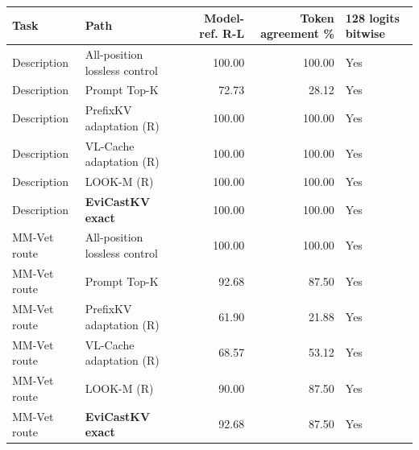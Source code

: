 \begin{tabular}{llrrl}
\toprule
Task & Path & Model-ref. R-L & Token agreement \% & 128 logits bitwise\\\midrule
Description & All-position lossless control & 100.00 & 100.00 & Yes\\
Description & Prompt Top-K & 72.73 & 28.12 & Yes\\
Description & PrefixKV adaptation (R) & 100.00 & 100.00 & Yes\\
Description & VL-Cache adaptation (R) & 100.00 & 100.00 & Yes\\
Description & LOOK-M (R) & 100.00 & 100.00 & Yes\\
Description & \textbf{EviCastKV exact} & 100.00 & 100.00 & Yes\\
MM-Vet route & All-position lossless control & 100.00 & 100.00 & Yes\\
MM-Vet route & Prompt Top-K & 92.68 & 87.50 & Yes\\
MM-Vet route & PrefixKV adaptation (R) & 61.90 & 21.88 & Yes\\
MM-Vet route & VL-Cache adaptation (R) & 68.57 & 53.12 & Yes\\
MM-Vet route & LOOK-M (R) & 90.00 & 87.50 & Yes\\
MM-Vet route & \textbf{EviCastKV exact} & 92.68 & 87.50 & Yes\\
\bottomrule
\end{tabular}

